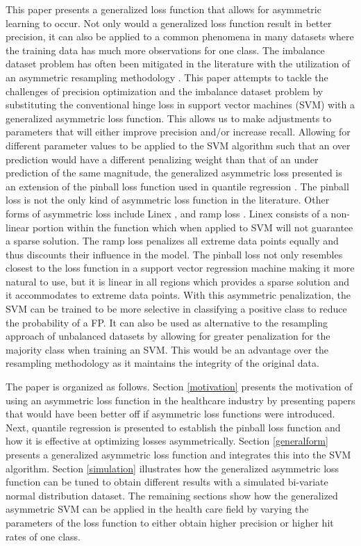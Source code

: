 \documentclass[twoside,11pt]{article}
\begin{document}
This paper presents a generalized loss function that allows for asymmetric learning to occur. Not only would a generalized loss function result in better precision, it can also be applied to a common phenomena in many datasets where the training data has much more observations for one class. The imbalance dataset problem has often been mitigated in the literature with the utilization of an asymmetric resampling methodology \citep{Hamed04}. This paper attempts to tackle the challenges of precision optimization and the imbalance dataset problem by substituting the conventional hinge loss in support vector machines (SVM) with a generalized asymmetric loss function. This allows us to make adjustments to parameters that will either improve precision and/or increase recall. Allowing for different parameter values to be applied to the SVM algorithm such that an over prediction would have a different penalizing weight than that of an under prediction of the same magnitude, the generalized asymmetric loss presented is an extension of the pinball loss function \citet{Koenker01} used in quantile regression \citep{Steinwart07}. The pinball loss is not the only kind of asymmetric loss function in the literature. Other forms of asymmetric loss include Linex \citep{Demetrescu07} \citep{Ohtani95}, and ramp loss \citep{Takeuchi06}. Linex consists of a non-linear portion within the function which when applied to SVM will not guarantee a sparse solution. The ramp loss penalizes all extreme data points equally and thus discounts their influence in the model. The pinball loss not only resembles closest to the loss function in a support vector regression machine making it more natural to use, but it is linear in all regions which provides a sparse solution and it accommodates to extreme data points. With this asymmetric penalization, the SVM can be trained to be more selective in classifying a positive class to reduce the probability of a FP. It can also be used as alternative to the resampling approach of unbalanced datasets by allowing for greater penalization for the majority class when training an SVM. This would be an advantage over the resampling methodology as it maintains the integrity of the original data.

The paper is organized as follows. Section \ref{motivation} presents the motivation of using an asymmetric loss function in the healthcare industry by presenting papers that would have been better off if asymmetric loss functions were introduced. Next, quantile regression is presented to establish the pinball loss function and how it is effective at optimizing losses asymmetrically. Section \ref{generalform} presents a generalized asymmetric loss function and integrates this into the SVM algorithm. Section \ref{simulation} illustrates how the generalized asymmetric loss function can be tuned to obtain different results with a simulated bi-variate normal distribution dataset. The remaining sections show how the generalized asymmetric SVM can be applied in the health care field by varying the parameters of the loss function to either obtain higher precision or higher hit rates of one class.
\end{document}
